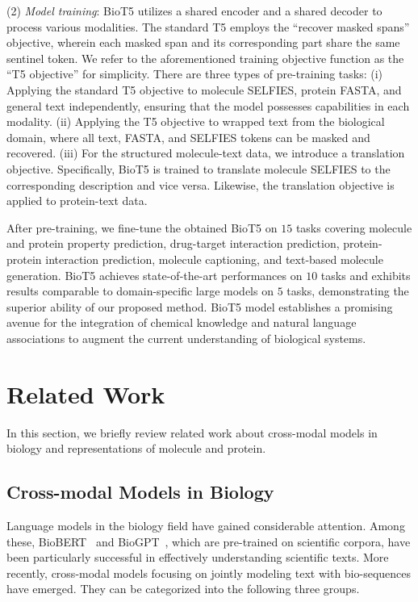 \documentclass[11pt]{article}
\newcommand{\method}{{BioT5}}
\begin{document}
(2) {\em Model training}: \method{} utilizes a shared encoder and a shared decoder to process various modalities. The standard T5 employs the ``recover masked spans'' objective, wherein each masked span and its corresponding part share the same sentinel token. We refer to the aforementioned training objective function as the ``T5 objective'' for simplicity. There are three types of pre-training tasks: (i) Applying the standard T5 objective to molecule SELFIES, protein FASTA, and general text independently, ensuring that the model possesses capabilities in each modality. (ii) Applying the T5 objective to wrapped text from the biological domain, where all text, FASTA, and SELFIES tokens can be masked and recovered. (iii) For the structured molecule-text data, we introduce a translation objective. Specifically, \method{} is trained to translate molecule SELFIES to the corresponding description and vice versa. Likewise, the translation objective is applied to protein-text data. 

After pre-training, we fine-tune the obtained \method{} on $15$ tasks covering molecule and protein property prediction, drug-target interaction prediction, protein-protein interaction prediction, molecule captioning, and text-based molecule generation. \method{} achieves state-of-the-art performances on $10$ tasks and exhibits results comparable to domain-specific large models on $5$ tasks, demonstrating the superior ability of our proposed method. 
\method{} model establishes a promising avenue for the integration of chemical knowledge and natural language associations to augment the current understanding of biological systems.


\section{Related Work}
In this section, we briefly review related work about cross-modal models in biology and representations of molecule and protein.

\subsection{Cross-modal Models in Biology}
\label{sec:cross_modal}
Language models in the biology field have gained considerable attention.
Among these, BioBERT~\citep{lee2020biobert} and BioGPT~\citep{luo2022biogpt}, which are pre-trained on scientific corpora, have been particularly successful in effectively understanding scientific texts.
More recently, cross-modal models focusing on jointly modeling text with bio-sequences have emerged.
They can be categorized into the following three groups.
\end{document}
